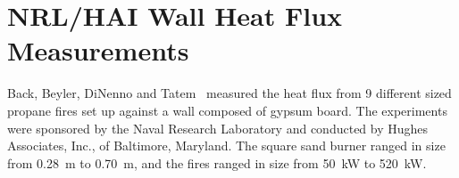 %
%
%
%
%


\section{NRL/HAI Wall Heat Flux Measurements}
\label{NRL_HAI_Description}

Back, Beyler, DiNenno and Tatem~\cite{Back:IAFSS4} measured the heat flux from 9 different sized propane fires set up against a wall composed
of gypsum board. The experiments were sponsored by the Naval Research Laboratory and conducted by Hughes Associates, Inc., of Baltimore, Maryland. The
square sand burner ranged in size from 0.28~m to 0.70~m, and the fires ranged in size from 50~kW to 520~kW.



